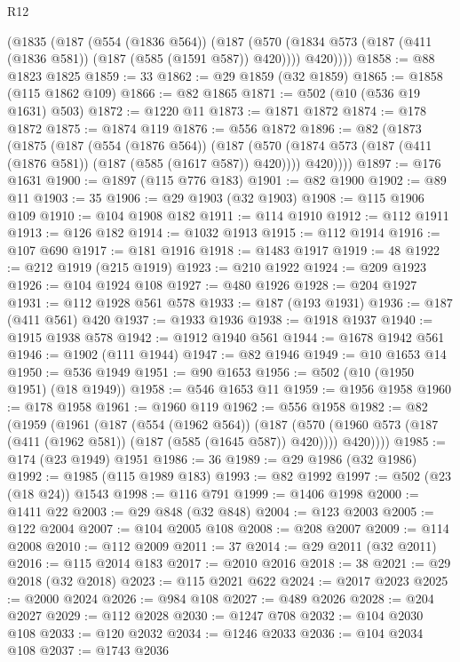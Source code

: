 \begin{lexlean}{R12}
\begin{coremodule}
      (@1835
        (@187
          (@554 (@1836 @564))
          (@187
            (@570 (@1834 @573 (@187 (@411 (@1836 @581)) (@187 (@585 (@1591 @587)) @420))))
            @420))))
@1858 := @88 @1823 @1825
@1859 := 33
@1862 := @29 @1859 (@32 @1859)
@1865 := @1858 (@115 @1862 @109)
@1866 := @82 @1865
@1871 := @502 (@10 (@536 @19 @1631) @503)
@1872 := @1220 @11
@1873 := @1871 @1872
@1874 := @178 @1872
@1875 := @1874 @119
@1876 := @556 @1872
@1896 := @82
    (@1873
      (@1875
        (@187
          (@554 (@1876 @564))
          (@187
            (@570 (@1874 @573 (@187 (@411 (@1876 @581)) (@187 (@585 (@1617 @587)) @420))))
            @420))))
@1897 := @176 @1631
@1900 := @1897 (@115 @776 @183)
@1901 := @82 @1900
@1902 := @89 @11
@1903 := 35
@1906 := @29 @1903 (@32 @1903)
@1908 := @115 @1906 @109
@1910 := @104 @1908 @182
@1911 := @114 @1910
@1912 := @112 @1911
@1913 := @126 @182
@1914 := @1032 @1913
@1915 := @112 @1914
@1916 := @107 @690
@1917 := @181 @1916
@1918 := @1483 @1917
@1919 := 48
@1922 := @212 @1919 (@215 @1919)
@1923 := @210 @1922
@1924 := @209 @1923
@1926 := @104 @1924 @108
@1927 := @480 @1926
@1928 := @204 @1927
@1931 := @112 @1928 @561 @578
@1933 := @187 (@193 @1931)
@1936 := @187 (@411 @561) @420
@1937 := @1933 @1936
@1938 := @1918 @1937
@1940 := @1915 @1938 @578
@1942 := @1912 @1940 @561
@1944 := @1678 @1942 @561
@1946 := @1902 (@111 @1944)
@1947 := @82 @1946
@1949 := @10 @1653 @14
@1950 := @536 @1949
@1951 := @90 @1653
@1956 := @502 (@10 (@1950 @1951) (@18 @1949))
@1958 := @546 @1653 @11
@1959 := @1956 @1958
@1960 := @178 @1958
@1961 := @1960 @119
@1962 := @556 @1958
@1982 := @82
    (@1959
      (@1961
        (@187
          (@554 (@1962 @564))
          (@187
            (@570 (@1960 @573 (@187 (@411 (@1962 @581)) (@187 (@585 (@1645 @587)) @420))))
            @420))))
@1985 := @174 (@23 @1949) @1951
@1986 := 36
@1989 := @29 @1986 (@32 @1986)
@1992 := @1985 (@115 @1989 @183)
@1993 := @82 @1992
@1997 := @502 (@23 (@18 @24)) @1543
@1998 := @116 @791
@1999 := @1406 @1998
@2000 := @1411 @22
@2003 := @29 @848 (@32 @848)
@2004 := @123 @2003
@2005 := @122 @2004
@2007 := @104 @2005 @108
@2008 := @208 @2007
@2009 := @114 @2008
@2010 := @112 @2009
@2011 := 37
@2014 := @29 @2011 (@32 @2011)
@2016 := @115 @2014 @183
@2017 := @2010 @2016
@2018 := 38
@2021 := @29 @2018 (@32 @2018)
@2023 := @115 @2021 @622
@2024 := @2017 @2023
@2025 := @2000 @2024
@2026 := @984 @108
@2027 := @489 @2026
@2028 := @204 @2027
@2029 := @112 @2028
@2030 := @1247 @708
@2032 := @104 @2030 @108
@2033 := @120 @2032
@2034 := @1246 @2033
@2036 := @104 @2034 @108
@2037 := @1743 @2036

\end{coremodule}
\end{lexlean}

